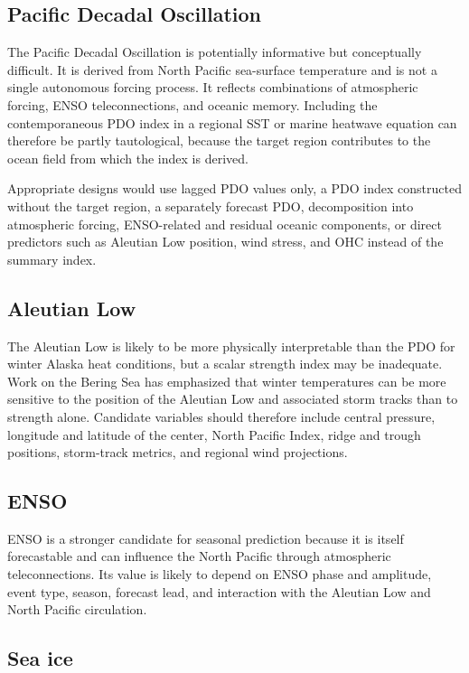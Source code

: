 \documentclass[11pt]{article}
\newcommand{\MHW}{marine heatwave}
\begin{document}
\subsection{Pacific Decadal Oscillation}

The Pacific Decadal Oscillation is potentially informative but conceptually difficult. It is derived from North Pacific sea-surface temperature and is not a single autonomous forcing process. It reflects combinations of atmospheric forcing, ENSO teleconnections, and oceanic memory. Including the contemporaneous PDO index in a regional SST or \MHW{} equation can therefore be partly tautological, because the target region contributes to the ocean field from which the index is derived.

Appropriate designs would use lagged PDO values only, a PDO index constructed without the target region, a separately forecast PDO, decomposition into atmospheric forcing, ENSO-related and residual oceanic components, or direct predictors such as Aleutian Low position, wind stress, and OHC instead of the summary index.

\subsection{Aleutian Low}

The Aleutian Low is likely to be more physically interpretable than the PDO for winter Alaska heat conditions, but a scalar strength index may be inadequate. Work on the Bering Sea has emphasized that winter temperatures can be more sensitive to the position of the Aleutian Low and associated storm tracks than to strength alone. Candidate variables should therefore include central pressure, longitude and latitude of the center, North Pacific Index, ridge and trough positions, storm-track metrics, and regional wind projections.

\subsection{ENSO}

ENSO is a stronger candidate for seasonal prediction because it is itself forecastable and can influence the North Pacific through atmospheric teleconnections. Its value is likely to depend on ENSO phase and amplitude, event type, season, forecast lead, and interaction with the Aleutian Low and North Pacific circulation.

\subsection{Sea ice}
\end{document}
